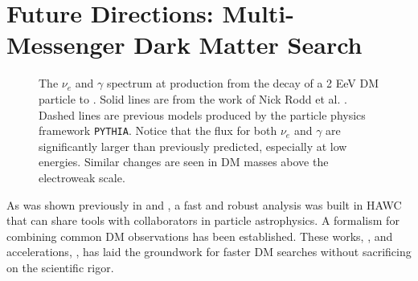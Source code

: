 \section{Future Directions: Multi-Messenger Dark Matter Search}\label{sec:future}

\begin{figure}[h]
    \caption{The $\nu_e$ and $\gamma$ spectrum at production from the decay of a 2 EeV DM particle to . Solid lines are from the work of Nick Rodd et al. \cite{Rodd:HDM_spec}. Dashed lines are previous models produced by the particle physics framework \texttt{PYTHIA}. Notice that the flux for both $\nu_e$ and $\gamma$ are significantly larger than previously predicted, especially at low energies. Similar changes are seen in DM masses above the electroweak scale.}
    \label{fig:nu_and_gam}
\end{figure}

As was shown previously in  and , a fast and robust analysis was built in HAWC that can share tools with collaborators in particle astrophysics.
A formalism for combining common DM observations has been established.
These works, , and accelerations, , has laid the groundwork for faster DM searches without sacrificing on the scientific rigor.

